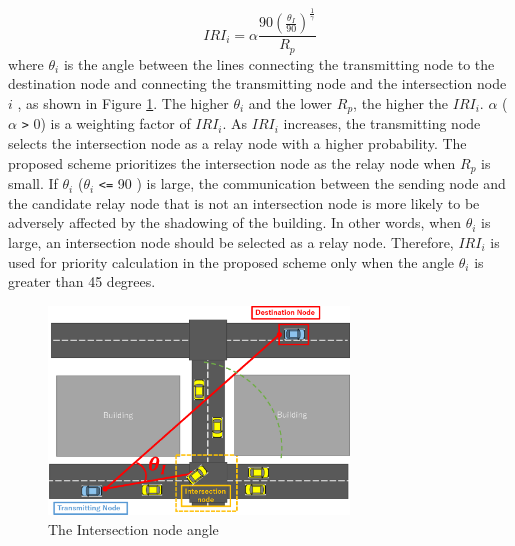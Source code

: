 \documentclass[conference]{IEEEtran}
\begin{document}
\begin{equation}
\label{IRI}
IRI_i = \alpha\frac{90\left(\frac{\theta_I}{90}\right)^\frac{1}{{\gamma}}}{R_p}
\end{equation}
where $\theta_i$ is the angle between the lines connecting the transmitting node to the destination node and  connecting the transmitting node and the intersection node $i$ , as shown in Figure \ref{fig:intersection_angle}.
The higher $\theta_i$  and the lower  $R_p$, the higher the $IRI_i$.
$\alpha$ ($\alpha$ \verb|>| 0) is a weighting factor of $IRI_i$.
As $IRI_i$ increases, the transmitting node selects the intersection node as a relay node with a higher probability. 
The proposed scheme prioritizes the intersection node as the relay node when $R_p$ is small. 
If $\theta_i$ ($\theta_i$ \verb|<=| 90 ) is large, the communication between the sending node and the candidate relay node that is not an intersection node is more likely to be adversely affected by the shadowing of the building. In other words, when $\theta_i$ is large, an intersection node should be selected as a relay node. Therefore, $IRI_i$ is used for priority calculation in the proposed scheme only when the angle $\theta_i$ is greater than 45 degrees.


\begin{figure}[!ht]
\centering
\includegraphics[width=80mm]{figures/Intersection_angle.eps}
\caption{The Intersection node angle}
\label{fig:intersection_angle}
\end{figure}
\end{document}

